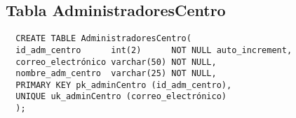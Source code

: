 \subsection{Tabla AdministradoresCentro}

\begin{verbatim}
  CREATE TABLE AdministradoresCentro(
  id_adm_centro      int(2)      NOT NULL auto_increment,
  correo_electrónico varchar(50) NOT NULL,
  nombre_adm_centro  varchar(25) NOT NULL,
  PRIMARY KEY pk_adminCentro (id_adm_centro),
  UNIQUE uk_adminCentro (correo_electrónico)
  );
\end{verbatim}